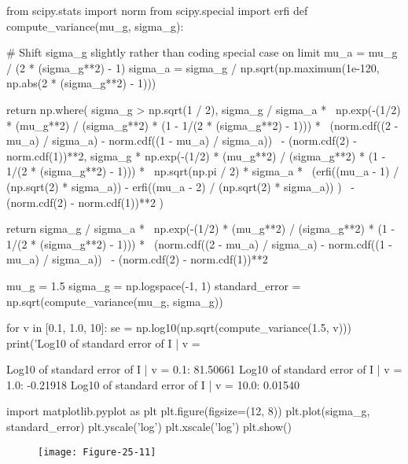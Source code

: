 \begin{python}
from scipy.stats import norm
from scipy.special import erfi
def compute_variance(mu_g, sigma_g):
    
    # Shift sigma_g slightly rather than coding special case on limit
    mu_a = mu_g / (2 * (sigma_g**2) - 1)
    sigma_a = sigma_g / np.sqrt(np.maximum(1e-120, np.abs(2 * (sigma_g**2) - 1)))
    
    return np.where(
        sigma_g > np.sqrt(1 / 2),
        sigma_g / sigma_a * \
            np.exp(-(1/2) * (mu_g**2) / (sigma_g**2) * (1 - 1/(2 * (sigma_g**2) - 1))) * \
            (norm.cdf((2 - mu_a) / sigma_a) - norm.cdf((1 - mu_a) / sigma_a)) \
            - (norm.cdf(2) - norm.cdf(1))**2,
        sigma_g * np.exp(-(1/2) * (mu_g**2) / (sigma_g**2) * (1 - 1/(2 * (sigma_g**2) - 1))) * \
            np.sqrt(np.pi / 2) * sigma_a * \
                (erfi((mu_a - 1) / (np.sqrt(2) * sigma_a)) 
                - erfi((mu_a - 2) / (np.sqrt(2) * sigma_a)) ) \
            - (norm.cdf(2) - norm.cdf(1))**2   
    )
    
    return sigma_g / sigma_a * \
        np.exp(-(1/2) * (mu_g**2) / (sigma_g**2) * (1 - 1/(2 * (sigma_g**2) - 1))) * \
        (norm.cdf((2 - mu_a) / sigma_a) - norm.cdf((1 - mu_a) / sigma_a)) \
        - (norm.cdf(2) - norm.cdf(1))**2 
\end{python}

\begin{python}
mu_g = 1.5
sigma_g = np.logspace(-1, 1)
standard_error = np.sqrt(compute_variance(mu_g, sigma_g))
\end{python}

\begin{python}
for v in [0.1, 1.0, 10]:
    se = np.log10(np.sqrt(compute_variance(1.5, v)))
    print('Log10 of standard error of I | v = %
\end{python}
\begin{console}
Log10 of standard error of I | v = 0.1:   81.50661
Log10 of standard error of I | v = 1.0:   -0.21918
Log10 of standard error of I | v = 10.0:   0.01540
\end{console}

\begin{python}
import matplotlib.pyplot as plt
plt.figure(figsize=(12, 8))
plt.plot(sigma_g, standard_error)
plt.yscale('log')
plt.xscale('log')
plt.show()
\end{python}

\begin{figure}[H]
\centering
\texttt{[image: Figure-25-11]}
\end{figure}

